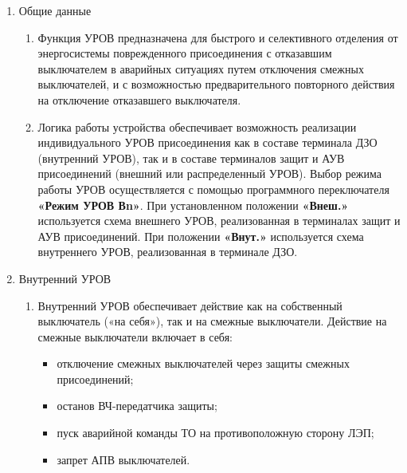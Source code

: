 \color{black}

\begin{enumerate}[label=\arabic{section}.\arabic{subsection}.\arabic{enumi}, labelsep=4pt, leftmargin=0pt, itemindent=57pt, itemsep=0pt, parsep=5pt] %


\item Общие данные

\begin{enumerate}[label=\arabic{section}.\arabic{subsection}.\arabic{enumi}.\arabic*, labelsep=4pt, leftmargin=0em, itemindent=65pt, parsep=0pt]

\item
Функция УРОВ предназначена для быстрого и селективного отделения от энергосистемы поврежденного присоединения с отказавшим выключателем в аварийных ситуациях путем отключения смежных выключателей, и с возможностью предварительного повторного действия на отключение отказавшего выключателя.

\item
Логика работы устройства обеспечивает возможность реализации индивидуального УРОВ присоединения как в составе терминала ДЗО (внутренний УРОВ), так и в составе терминалов защит и АУВ присоединений (внешний или распределенный УРОВ).
Выбор режима работы УРОВ осуществляется с помощью программного переключателя \textbf{«Режим УРОВ Вn»}.
При установленном положении \textbf{«Внеш.»} используется схема внешнего УРОВ, реализованная в терминалах защит и АУВ присоединений.
При положении \textbf{«Внут.»} используется схема внутреннего УРОВ, реализованная в терминале ДЗО.

\end {enumerate}


\item Внутренний УРОВ

\begin{enumerate}[label=\arabic{section}.\arabic{subsection}.\arabic{enumi}.\arabic*, labelsep=4pt, leftmargin=0em, itemindent=65pt, parsep=0pt]

\item
Внутренний УРОВ обеспечивает действие как на собственный выключатель («на себя»), так и на смежные выключатели.
Действие на смежные выключатели включает в себя:
\begin{itemize}
\item отключение смежных выключателей через защиты смежных присоединений;
\item останов ВЧ-передатчика защиты;
\item пуск аварийной команды ТО на противоположную сторону ЛЭП;
\item запрет АПВ выключателей.
\end{itemize}


\end{enumerate}
\end{enumerate}
